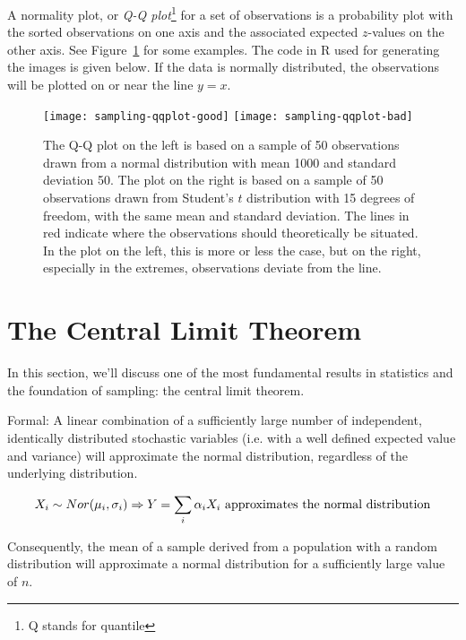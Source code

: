 \begin{definition}
    \label{def:qq-plot}
    A normality plot, or \emph{Q-Q plot}\footnote{Q stands for quantile} for a set of observations is a probability plot with the sorted observations on one axis and the associated expected $z$-values on the other axis. See Figure~\ref{fig:qqplot} for some examples. The code in R used for generating the images is given below. If the data is normally distributed, the observations will be plotted on or near the line $y = x$.
  \end{definition}

\begin{figure}
  \begin{center}
    \texttt{[image: sampling-qqplot-good]}
    \texttt{[image: sampling-qqplot-bad]}
  \end{center}
  \caption{The Q-Q plot on the left is based on a sample of 50 observations drawn from a normal distribution with mean 1000 and standard deviation 50. The plot on the right is based on a sample of 50 observations drawn from Student's $t$ distribution with 15 degrees of freedom, with the same mean and standard deviation. The lines in red indicate where the observations should theoretically be situated. In the plot on the left, this is more or less the case, but on the right, especially in the extremes, observations deviate from the line.}
  \label{fig:qqplot}
\end{figure}



\section{The Central Limit Theorem}
\label{sec:central-limit-theorem}

In this section, we'll discuss one of the most fundamental results in statistics and the foundation of sampling: the central limit theorem.

\begin{definition}
  Formal: A linear combination of a sufficiently large number of independent, identically distributed stochastic variables (i.e. with a well defined expected value and variance) will approximate the normal distribution, regardless of the underlying distribution.

  \[X_{i} \sim Nor(\mu_{i}, \sigma_{i}) \Rightarrow Y = \sum_{i} \alpha_{i} X_{i} \textnormal{ approximates the normal distribution} \]

  Consequently, the mean of a sample derived from a population with a random distribution will approximate a normal distribution for a sufficiently large value of $n$.
\end{definition}

